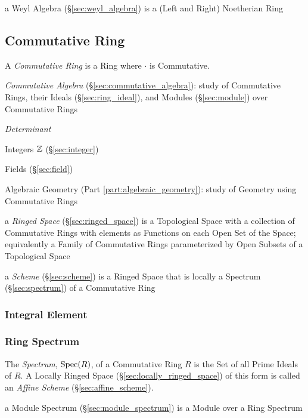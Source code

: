 \fist a Weyl Algebra (\S\ref{sec:weyl_algebra}) is a (Left and Right)
Noetherian Ring



\subsection{Commutative Ring}\label{sec:commutative_ring}

A \emph{Commutative Ring} is a Ring where $\cdot$ is Commutative.

\fist \emph{Commutative Algebra} (\S\ref{sec:commutative_algebra}): study of
Commutative Rings, their Ideals (\S\ref{sec:ring_ideal}), and Modules
(\S\ref{sec:module}) over Commutative Rings

\emph{Determinant}

Integers $\mathbb{Z}$ (\S\ref{sec:integer})

Fields (\S\ref{sec:field})

Algebraic Geometry (Part \ref{part:algebraic_geometry}): study of
Geometry using Commutative Rings

\fist a \emph{Ringed Space} (\S\ref{sec:ringed_space}) is a Topological Space
with a collection of Commutative Rings with elements as Functions on each Open
Set of the Space; equivalently a Family of Commutative Rings parameterized by
Open Subsets of a Topological Space

\fist a \emph{Scheme} (\S\ref{sec:scheme}) is a Ringed Space that is locally a
Spectrum (\S\ref{sec:spectrum}) of a Commutative Ring



\subsubsection{Integral Element}\label{sec:integral_element}

\subsubsection{Ring Spectrum}\label{sec:ring_spectrum}

The \emph{Spectrum}, $\mathrm{Spec}(R)$, of a Commutative Ring $R$ is the Set of all
Prime Ideals of $R$. A Locally Ringed Space (\S\ref{sec:locally_ringed_space})
of this form is called an \emph{Affine Scheme} (\S\ref{sec:affine_scheme}).

a Module Spectrum (\S\ref{sec:module_spectrum}) is a Module over a Ring Spectrum

